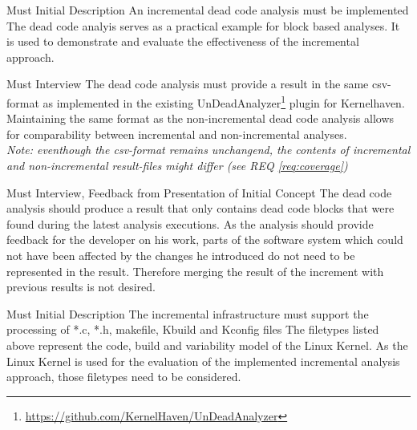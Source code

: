 \documentclass[a4paper]{article}
\begin{document}
\begin{req} \label{req:dead-code-analysis}
\reqtable
	{Must}  {Initial Description}
	{An incremental dead code analysis must be implemented}
	{The dead code analyis serves as a practical example for block based analyses. It is used to demonstrate and evaluate the effectiveness of the incremental approach.}
	
	\begin{subreq} \label{req:format}
    \reqtable
    {Must}  {Interview}
	{The dead code analysis must provide a result in the same csv-format as implemented in the existing UnDeadAnalyzer\footnote{\url{https://github.com/KernelHaven/UnDeadAnalyzer}} plugin for Kernelhaven.}
	{Maintaining the same format as the non-incremental dead code analysis allows for comparability between incremental and non-incremental analyses. \\
	\emph{Note: eventhough the csv-format remains unchangend, the contents of incremental and non-incremental result-files might differ (see REQ \ref{req:coverage})}}
	\end{subreq}
	
	\begin{subreq} \label{req:coverage}
    \reqtable
    {Must}  {Interview, Feedback from Presentation of Initial Concept}
	{The dead code analysis should produce a result that only contains dead code blocks that were found during the latest analysis executions.}
	{As the analysis should provide feedback for the developer on his work, parts of the software system which could not have been affected by the changes he introduced do not need to be represented in the result. Therefore merging the result of the increment with previous results is not desired.}
	\end{subreq}
\end{req}

\clearpage
\begin{req} \label{req:target-artifacts}
\reqtable
    {Must}  {Initial Description}
	{The incremental infrastructure must support the processing of *.c, *.h, makefile, Kbuild and Kconfig files}
	{The filetypes listed above represent the code, build and variability model of the Linux Kernel. As the Linux Kernel is used for the evaluation of the implemented incremental analysis approach, those filetypes need to be considered.}
\end{req}
\end{document}
